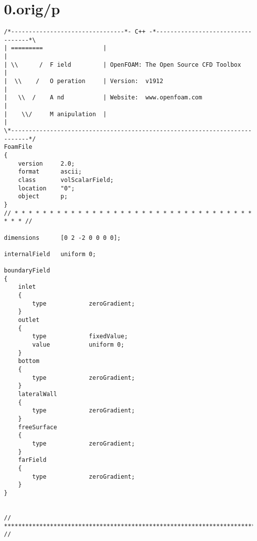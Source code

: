 \section{0.orig/p}
\begin{lstlisting}
/*--------------------------------*- C++ -*----------------------------------*\
| =========                 |                                                 |
| \\      /  F ield         | OpenFOAM: The Open Source CFD Toolbox           |
|  \\    /   O peration     | Version:  v1912                                 |
|   \\  /    A nd           | Website:  www.openfoam.com                      |
|    \\/     M anipulation  |                                                 |
\*---------------------------------------------------------------------------*/
FoamFile
{
    version     2.0;
    format      ascii;
    class       volScalarField;
    location    "0";
    object      p;
}
// * * * * * * * * * * * * * * * * * * * * * * * * * * * * * * * * * * * * * //

dimensions      [0 2 -2 0 0 0 0];

internalField   uniform 0;

boundaryField
{
    inlet
    {
        type            zeroGradient;
    }
    outlet
    {
        type            fixedValue;
        value           uniform 0;
    }
    bottom
    {
        type            zeroGradient;
    }
    lateralWall
    {
        type            zeroGradient;
    }
    freeSurface
    {
        type            zeroGradient;
    }
    farField
    {
		type			zeroGradient;
	}
}


// ************************************************************************* //

\end{lstlisting}

